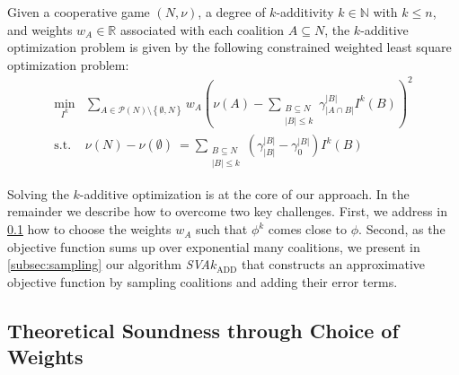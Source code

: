 \begin{definition} \label{def:optimization}
    Given a cooperative game $(N, \nu)$, a degree of $k$-additivity $k \in \mathbb{N}$ with $k \leq n$, and weights $w_A \in \mathbb{R}$ associated with each coalition $A \subseteq N$, the $k$-additive optimization problem is given by the following constrained weighted least square optimization problem:
    \begin{equation*}
        \begin{array}{rl}
            \displaystyle\min_{I^k} & \sum\limits_{A \in \mathcal{P}(N) \setminus \left\{\emptyset, N \right\}} w_A \left( \nu(A) - \sum\limits_{\substack{B \subseteq N \\ |B| \leq k}} \gamma^{\left|B \right|}_{\left| A \cap B \right|} I^k(B) \right)^2 \\
            \text{s.t.} & \nu(N) - \nu(\emptyset) \ = \sum\limits_{\substack{B \subseteq N \\ |B| \leq k}} \left( \gamma^{\left|B \right|}_{\left| B \right|} - \gamma^{\left| B \right|}_0 \right) I^k(B)
        \end{array}
    \end{equation*}
\end{definition}
Solving the $k$-additive optimization is at the core of our approach.
In the remainder we describe how to overcome two key challenges.
First, we address in \cref{subsec:theory} how to choose the weights $w_A$ such that $\phi^k$ comes close to $\phi$.
Second, as the objective function sums up over exponential many coalitions, we present in \cref{subsec:sampling} our algorithm \emph{SVA}$k_{\text{ADD}}$ that constructs an approximative objective function by sampling coalitions and adding their error terms.

\subsection{Theoretical Soundness through Choice of Weights}
\label{subsec:theory}

